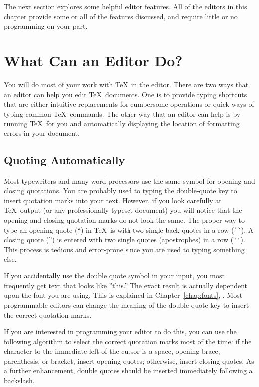 The next section explores some helpful
editor features.  All of the editors in this
chapter provide some or all of the features discussed, and require
little or no programming on your part.

\section{What Can an Editor Do?}
\label{sec:whatcando}

You will do most of your work with \TeX\ in the 
editor.  There are two
ways that an editor can help you edit \TeX\ documents.  One is to
provide typing shortcuts that are either intuitive replacements for
cumbersome operations or quick ways of typing common \TeX\ commands.
The other way that an editor can help is by running \TeX\ for you and
automatically displaying the location of formatting errors in your
document.

\subsection{Quoting Automatically}

Most typewriters and many word processors use the same symbol for
opening and closing quotations.  You are probably used to typing the
double-quote key to insert quotation marks into your text.  However,
if you look carefully at \TeX\ output (or any professionally typeset
document) you will notice that the opening and closing quotation marks
do not look the same.  The proper way to type an opening quote (``) in
\TeX\ is with two single back-quotes in a row (\verb|``|).  A closing 
quote ('') is entered with two single quotes (apostrophes) in a 
row (\verb|''|).  This process is
tedious and error-prone since you are used to typing something else.

If you accidentally use the double quote symbol in your input, you most
frequently get text that looks like ''this.''  The exact result is actually
dependent upon the font you are using.  This is explained in
Chapter~\ref{chap:fonts}, {\it {}}.
Most programmable editors can change the meaning of the double-quote
key to insert the correct quotation marks.

If you are interested in programming your editor to do this, you can use
the following
algorithm to select the correct quotation marks most of the time:  if the
character to the immediate left of the cursor is a space, opening
brace, parenthesis, or bracket, insert opening quotes; otherwise, insert
closing quotes.  As a further enhancement, double quotes should be inserted
immediately following a backslash.

